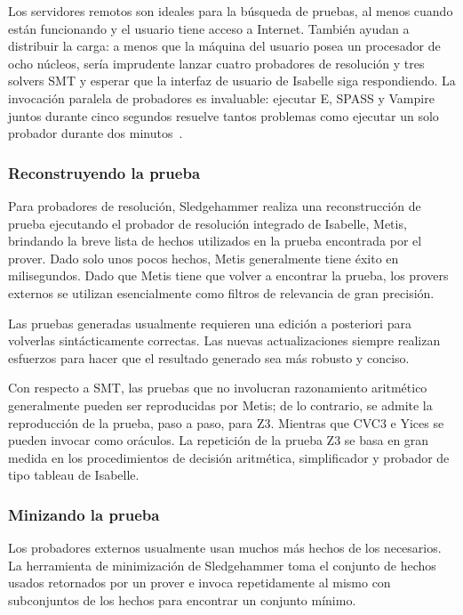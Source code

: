 \documentclass[12pt]{book}
\begin{document}
Los servidores remotos son ideales para la búsqueda de pruebas, al menos cuando están funcionando y el usuario tiene acceso a Internet. También ayudan a distribuir la carga: a menos que la máquina del usuario posea un procesador de ocho núcleos, sería imprudente lanzar cuatro probadores de resolución y tres solvers SMT y esperar que la interfaz de usuario de Isabelle siga respondiendo. La invocación paralela de probadores es invaluable: ejecutar E, SPASS y Vampire juntos durante cinco segundos resuelve tantos problemas como ejecutar un solo probador durante dos minutos~\cite{sledgehammer_judgement_day}.

\subsubsection{Reconstruyendo la prueba}

Para probadores de resolución, Sledgehammer realiza una reconstrucción de prueba ejecutando el probador de resolución integrado de Isabelle, Metis, brindando la breve lista de hechos utilizados en la prueba encontrada por el prover. Dado solo unos pocos hechos, Metis generalmente tiene éxito en milisegundos. Dado que Metis tiene que volver a encontrar la prueba, los provers externos se utilizan esencialmente como filtros de relevancia de gran precisión.

Las pruebas generadas usualmente requieren una edición a posteriori para volverlas sintácticamente correctas. Las nuevas actualizaciones siempre realizan esfuerzos para hacer que el resultado generado sea más robusto y conciso.

Con respecto a SMT, las pruebas que no involucran razonamiento aritmético generalmente pueden ser reproducidas por Metis; de lo contrario, se admite la reproducción de la prueba, paso a paso, para Z3. Mientras que CVC3 e Yices se pueden invocar como oráculos. La repetición de la prueba Z3 se basa en gran medida en los procedimientos de decisión aritmética, simplificador y probador de tipo tableau de Isabelle.

\subsubsection{Minizando la prueba}

Los probadores externos usualmente usan muchos más hechos de los necesarios. La herramienta de minimización de Sledgehammer toma el conjunto de hechos usados retornados por un prover e invoca repetidamente al mismo con subconjuntos de los hechos para encontrar un conjunto mínimo.
\end{document}

